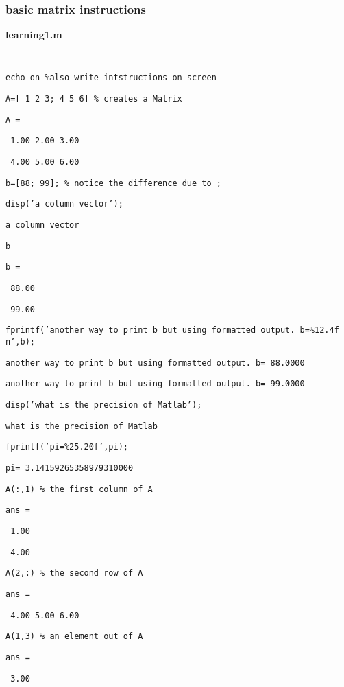 \documentclass[12pt,a4paper]{article}
\begin{document}
\subsubsection{basic matrix instructions}

\qquad \qquad

\textbf{learning1.m}

\texttt{\TEXTsymbol{>}\TEXTsymbol{>} }

\texttt{echo on \%also write intstructions on screen}

\texttt{A=[ 1 2 3; 4 5 6] \% creates a Matrix}

\texttt{A =}

\texttt{\ 1.00 2.00 3.00}

\texttt{\ 4.00 5.00 6.00}

\texttt{b=[88; 99]; \% notice the difference due to ;}

\texttt{disp('a column vector');}

\texttt{a column vector}

\texttt{b}

\texttt{b =}

\texttt{\ 88.00}

\texttt{\ 99.00}

\texttt{fprintf('another way to print b but using formatted output. b=\%12.4f%
\TEXTsymbol{\backslash}n',b);}

\texttt{another way to print b but using formatted output. b= 88.0000}

\texttt{another way to print b but using formatted output. b= 99.0000}

\texttt{disp('what is the precision of Matlab');}

\texttt{what is the precision of Matlab}

\texttt{fprintf('pi=\%25.20f',pi);}

\texttt{pi= 3.14159265358979310000}

\texttt{A(:,1) \% the first column of A}

\texttt{ans =}

\texttt{\ 1.00}

\texttt{\ 4.00}

\texttt{A(2,:) \% the second row of A}

\texttt{ans =}

\texttt{\ 4.00 5.00 6.00}

\texttt{A(1,3) \% an element out of A}

\texttt{ans =}

\texttt{\ 3.00}
\end{document}
